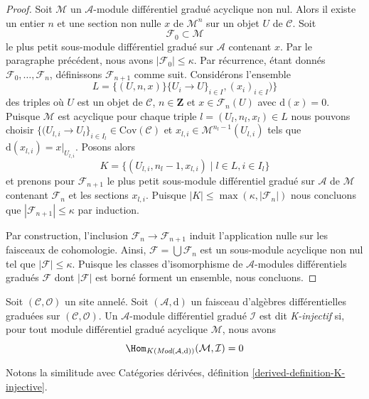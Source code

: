 \begin{proof}
\medskip\noindent
Soit $\mathcal{M}$ un
$\mathcal{A}$-module différentiel gradué acyclique non nul. Alors il existe un entier $n$ et une section
non nulle $x$ de $\mathcal{M}^n$ sur un objet $U$ de
$\mathcal{C}$. Soit
$$
\mathcal{F}_0 \subset \mathcal{M}
$$ le plus
petit sous-module différentiel gradué sur $\mathcal{A}$ contenant
$x$. Par le paragraphe précédent, nous avons
$|\mathcal{F}_0| \leq \kappa$. Par récurrence, étant donnés
$\mathcal{F}_0, \ldots, \mathcal{F}_n$, définissons
$\mathcal{F}_{n + 1}$ comme suit. Considérons
l'ensemble $$
L = \{(U, n, x)\}
\{U_i \to U\}_{i \in I}, (x_i)_{i \in I})\}
$$
des triples où $U$ est un objet de $\mathcal{C}$, $n \in \mathbf{Z}$
et $x \in \mathcal{F}_n(U)$ avec $\text{d}(x) = 0$. Puisque
$\mathcal{M}$ est acyclique pour chaque triple $l = (U_l, n_l, x_l) \in L$
nous pouvons
choisir $\{(U_{l, i} \to U_l\}_{i \in I_l} \in \text{Cov}(\mathcal{C})$
et $x_{l, i} \in \mathcal{M}^{n_l - 1}(U_{l, i})$ tels
que $\text{d}(x_{l, i}) = x|_{U_{l, i}}$. Posons alors
$$
K = \{(U_{l, i}, n_l - 1, x_{l, i}) \mid l \in L, i \in I_l\}
$$
et prenons pour $\mathcal{F}_{n + 1}$ le plus petit sous-module
différentiel gradué sur $\mathcal{A}$ de $\mathcal{M}$ contenant
$\mathcal{F}_n$ et les sections $x_{l, i}$.
Puisque $|K| \leq \max(\kappa, |\mathcal{F}_n|)$
nous concluons que $|\mathcal{F}_{n + 1}| \leq \kappa$ par induction.

\medskip\noindent
Par construction, l'inclusion $\mathcal{F}_n \to \mathcal{F}_{n + 1}$ induit
l'application nulle sur les faisceaux de cohomologie. Ainsi,
$\mathcal{F} = \bigcup \mathcal{F}_n$ est un sous-module acyclique non nul tel
que $|\mathcal{F}| \leq \kappa$. Puisque les classes d'isomorphisme
de $\mathcal{A}$-modules différentiels gradués
$\mathcal{F}$ dont $|\mathcal{F}|$ est borné forment un ensemble, nous concluons.
\end{proof}

\begin{definition}
\label{definition-K-injective} Soit
$(\mathcal{C}, \mathcal{O})$ un site annelé. Soit
$(\mathcal{A}, \text{d})$ un faisceau d'algèbres différentielles graduées sur
$(\mathcal{C}, \mathcal{O})$. Un $\mathcal{A}$-module différentiel gradué
$\mathcal{I}$ est dit {\it K-injectif} si, pour tout module différentiel
gradué acyclique $\mathcal{M}$, nous
avons $$
\Hom_{K(\textit{Mod}(\mathcal{A}, \text{d}))}(\mathcal{M}, \mathcal{I}) = 0
$$
\end{definition}

\noindent
Notons la similitude avec
Catégories dérivées, définition \ref{derived-definition-K-injective}.

